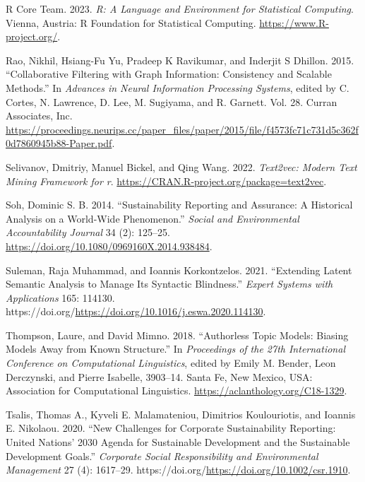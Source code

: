 \documentclass[
]{article}
\newlength{\cslhangindent}
\newlength{\cslentryspacingunit} %
\newenvironment{CSLReferences}[2] %
 {%
  \setlength{\parindent}{0pt}
  \ifodd #1
  \let\oldpar\par
  \def\par{\hangindent=\cslhangindent\oldpar}
  \fi
  \setlength{\parskip}{#2\cslentryspacingunit}
 }%
 {}
\begin{document}
\begin{CSLReferences}{1}{0}
\leavevmode{}%
R Core Team. 2023. \emph{R: A Language and Environment for Statistical Computing}. Vienna, Austria: R Foundation for Statistical Computing. \url{https://www.R-project.org/}.

\leavevmode{}%
Rao, Nikhil, Hsiang-Fu Yu, Pradeep K Ravikumar, and Inderjit S Dhillon. 2015. {``Collaborative Filtering with Graph Information: Consistency and Scalable Methods.''} In \emph{Advances in Neural Information Processing Systems}, edited by C. Cortes, N. Lawrence, D. Lee, M. Sugiyama, and R. Garnett. Vol. 28. Curran Associates, Inc. \url{https://proceedings.neurips.cc/paper_files/paper/2015/file/f4573fc71c731d5c362f0d7860945b88-Paper.pdf}.

\leavevmode{}%
Selivanov, Dmitriy, Manuel Bickel, and Qing Wang. 2022. \emph{Text2vec: Modern Text Mining Framework for r}. \url{https://CRAN.R-project.org/package=text2vec}.

\leavevmode{}%
Soh, Dominic S. B. 2014. {``Sustainability Reporting and Assurance: A Historical Analysis on a World-Wide Phenomenon.''} \emph{Social and Environmental Accountability Journal} 34 (2): 125--25. \url{https://doi.org/10.1080/0969160X.2014.938484}.

\leavevmode{}%
Suleman, Raja Muhammad, and Ioannis Korkontzelos. 2021. {``Extending Latent Semantic Analysis to Manage Its Syntactic Blindness.''} \emph{Expert Systems with Applications} 165: 114130. https://doi.org/\url{https://doi.org/10.1016/j.eswa.2020.114130}.

\leavevmode{}%
Thompson, Laure, and David Mimno. 2018. {``Authorless Topic Models: Biasing Models Away from Known Structure.''} In \emph{Proceedings of the 27th International Conference on Computational Linguistics}, edited by Emily M. Bender, Leon Derczynski, and Pierre Isabelle, 3903--14. Santa Fe, New Mexico, USA: Association for Computational Linguistics. \url{https://aclanthology.org/C18-1329}.

\leavevmode{}%
Tsalis, Thomas A., Kyveli E. Malamateniou, Dimitrios Koulouriotis, and Ioannis E. Nikolaou. 2020. {``New Challenges for Corporate Sustainability Reporting: United Nations' 2030 Agenda for Sustainable Development and the Sustainable Development Goals.''} \emph{Corporate Social Responsibility and Environmental Management} 27 (4): 1617--29. https://doi.org/\url{https://doi.org/10.1002/csr.1910}.


\end{CSLReferences}
\end{document}
